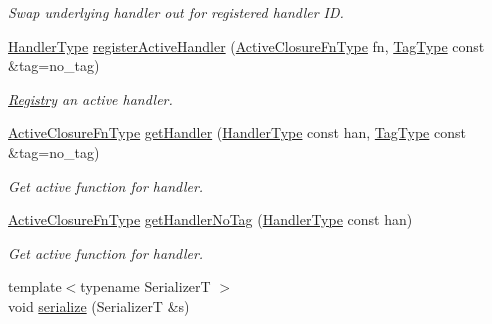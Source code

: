 \begin{DoxyCompactItemize}
\begin{DoxyCompactList}\small\item\em Swap underlying handler out for registered handler ID. \end{DoxyCompactList}\item 
\hyperlink{namespacevt_af64846b57dfcaf104da3ef6967917573}{Handler\+Type} \hyperlink{structvt_1_1registry_1_1_registry_ad4fdbf2cfbe4e852c5556435efe4255f}{register\+Active\+Handler} (\hyperlink{namespacevt_a2a06c34cafcd511828f16cbf1476b924}{Active\+Closure\+Fn\+Type} fn, \hyperlink{namespacevt_a84ab281dae04a52a4b243d6bf62d0e52}{Tag\+Type} const \&tag=no\+\_\+tag)
\begin{DoxyCompactList}\small\item\em \hyperlink{structvt_1_1registry_1_1_registry}{Registry} an active handler. \end{DoxyCompactList}\item 
\hyperlink{namespacevt_a2a06c34cafcd511828f16cbf1476b924}{Active\+Closure\+Fn\+Type} \hyperlink{structvt_1_1registry_1_1_registry_a01d56f18c894b21f27a798d0fd012b80}{get\+Handler} (\hyperlink{namespacevt_af64846b57dfcaf104da3ef6967917573}{Handler\+Type} const han, \hyperlink{namespacevt_a84ab281dae04a52a4b243d6bf62d0e52}{Tag\+Type} const \&tag=no\+\_\+tag)
\begin{DoxyCompactList}\small\item\em Get active function for handler. \end{DoxyCompactList}\item 
\hyperlink{namespacevt_a2a06c34cafcd511828f16cbf1476b924}{Active\+Closure\+Fn\+Type} \hyperlink{structvt_1_1registry_1_1_registry_ae5bbdd48ff66c6d64af9f03076374070}{get\+Handler\+No\+Tag} (\hyperlink{namespacevt_af64846b57dfcaf104da3ef6967917573}{Handler\+Type} const han)
\begin{DoxyCompactList}\small\item\em Get active function for handler. \end{DoxyCompactList}\item 
{\footnotesize template$<$typename SerializerT $>$ }\\void \hyperlink{structvt_1_1registry_1_1_registry_a6f8e97636b7fc7bae1b2bfa44b032691}{serialize} (SerializerT \&s)
\end{DoxyCompactItemize}
